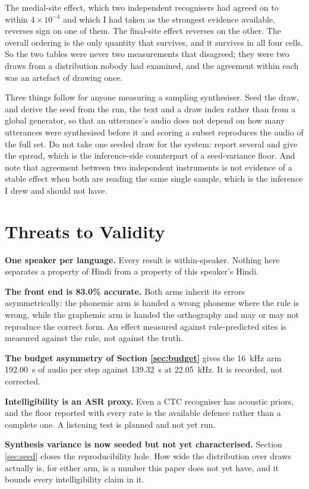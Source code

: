 \documentclass[runningheads]{llncs}
\begin{document}
The medial-site effect, which two independent recognisers had agreed on to
within $4 \times 10^{-4}$ and which I had taken as the strongest evidence
available, reverses sign on one of them. The final-site effect reverses on the
other. The overall ordering is the only quantity that survives, and it
survives in all four cells. So the two tables were never two measurements that
disagreed; they were two draws from a distribution nobody had examined, and the
agreement within each was an artefact of drawing once.

Three things follow for anyone measuring a sampling synthesiser. Seed the
draw, and derive the seed from the run, the text and a draw index rather than
from a global generator, so that an utterance's audio does not depend on how
many utterances were synthesised before it and scoring a subset reproduces the
audio of the full set. Do not take one seeded draw for the system: report
several and give the spread, which is the inference-side counterpart of a
seed-variance floor. And note that agreement between two independent
instruments is not evidence of a stable effect when both are reading the same
single sample, which is the inference I drew and should not have.

\section{Threats to Validity}

\textbf{One speaker per language.} Every result is within-speaker. Nothing here
separates a property of Hindi from a property of this speaker's Hindi.

\textbf{The front end is 83.0\% accurate.} Both arms inherit its errors
asymmetrically: the phonemic arm is handed a wrong phoneme where the rule is
wrong, while the graphemic arm is handed the orthography and may or may not
reproduce the correct form. An effect measured against rule-predicted sites is
measured against the rule, not against the truth.

\textbf{The budget asymmetry of Section \ref{sec:budget}} gives the 16~kHz arm
192.00~s of audio per step against 139.32~s at 22.05~kHz. It is recorded, not
corrected.

\textbf{Intelligibility is an ASR proxy.} Even a CTC recogniser has acoustic
priors, and the floor reported with every rate is the available defence rather
than a complete one. A listening test is planned and not yet run.

\textbf{Synthesis variance is now seeded but not yet characterised.} Section
\ref{sec:seed} closes the reproducibility hole. How wide the distribution over
draws actually is, for either arm, is a number this paper does not yet have,
and it bounds every intelligibility claim in it.
\end{document}
